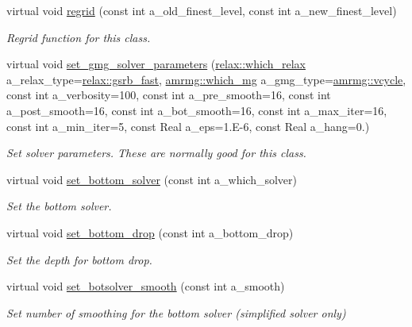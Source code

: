 \begin{DoxyCompactItemize}
virtual void \hyperlink{classeddington__sp1_ad63cd7683c0e57a993e91212d9f1efe6}{regrid} (const int a\+\_\+old\+\_\+finest\+\_\+level, const int a\+\_\+new\+\_\+finest\+\_\+level)
\begin{DoxyCompactList}\small\item\em Regrid function for this class. \end{DoxyCompactList}\item 
virtual void \hyperlink{classeddington__sp1_aaf0228a46dcf6ce9b37a62203d7f7835}{set\+\_\+gmg\+\_\+solver\+\_\+parameters} (\hyperlink{namespacerelax_a1b017edf55c06d103aa5b61e015fe219}{relax\+::which\+\_\+relax} a\+\_\+relax\+\_\+type=\hyperlink{namespacerelax_a1b017edf55c06d103aa5b61e015fe219a9f7cf3af97cc2038d3aceba1dbd02c7b}{relax\+::gsrb\+\_\+fast}, \hyperlink{namespaceamrmg_aa3e75c1253c968e52106305f762a7952}{amrmg\+::which\+\_\+mg} a\+\_\+gmg\+\_\+type=\hyperlink{namespaceamrmg_aa3e75c1253c968e52106305f762a7952abcef3ebc4ac4f095d5cf0e2e2b35c23e}{amrmg\+::vcycle}, const int a\+\_\+verbosity=100, const int a\+\_\+pre\+\_\+smooth=16, const int a\+\_\+post\+\_\+smooth=16, const int a\+\_\+bot\+\_\+smooth=16, const int a\+\_\+max\+\_\+iter=16, const int a\+\_\+min\+\_\+iter=5, const Real a\+\_\+eps=1.E-\/6, const Real a\+\_\+hang=0.)
\begin{DoxyCompactList}\small\item\em Set solver parameters. These are normally good for this class. \end{DoxyCompactList}\item 
virtual void \hyperlink{classeddington__sp1_a0a9aa38c03414d13ead35a7255cf0211}{set\+\_\+bottom\+\_\+solver} (const int a\+\_\+which\+\_\+solver)
\begin{DoxyCompactList}\small\item\em Set the bottom solver. \end{DoxyCompactList}\item 
virtual void \hyperlink{classeddington__sp1_a68ac2bb741ccf8d5e6e8990ba930590a}{set\+\_\+bottom\+\_\+drop} (const int a\+\_\+bottom\+\_\+drop)
\begin{DoxyCompactList}\small\item\em Set the depth for bottom drop. \end{DoxyCompactList}\item 
virtual void \hyperlink{classeddington__sp1_a0a9c490f49ff196b5aec2ad94bce4352}{set\+\_\+botsolver\+\_\+smooth} (const int a\+\_\+smooth)
\begin{DoxyCompactList}\small\item\em Set number of smoothing for the bottom solver (simplified solver only) \end{DoxyCompactList}\item 

\end{DoxyCompactItemize}
